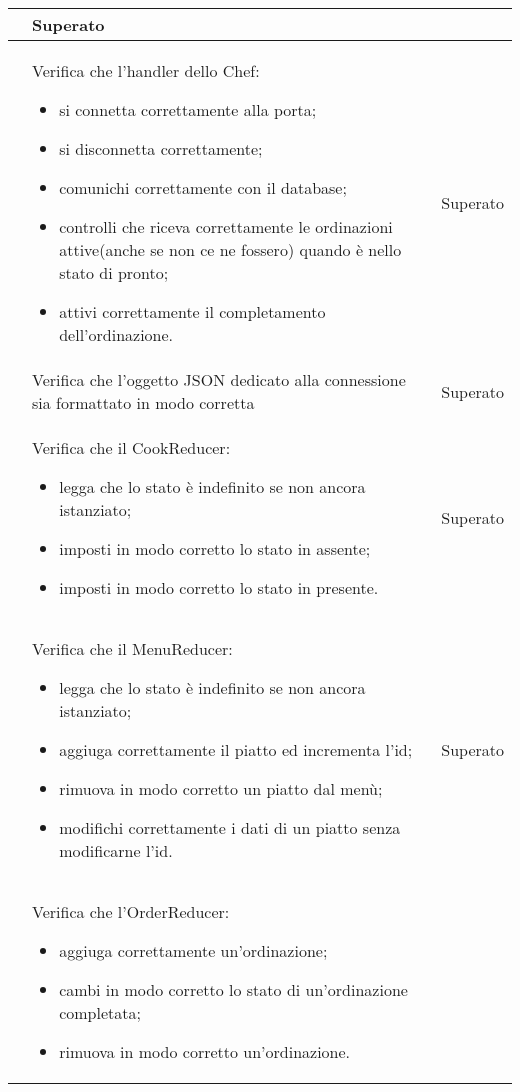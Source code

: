 \begin{longtable}{|c|P{9cm}|c|}
\begin{itemize}
	 \end{itemize}
	 & Superato \\
	 \hline{} & Verifica che l'handler dello Chef:
	 \begin{itemize}
	 	\item si connetta correttamente alla porta;
	 	\item si disconnetta correttamente;
	 	\item comunichi correttamente con il database;
	 	\item controlli che riceva correttamente le ordinazioni attive(anche se non ce ne fossero) quando è nello stato di pronto;
	 	\item attivi correttamente il completamento dell'ordinazione.
	 \end{itemize}
 	& Superato \\
	\hline{} & Verifica che l'oggetto JSON dedicato alla connessione sia formattato in modo corretta & Superato \\
	\hline {} & Verifica che il CookReducer:
	\begin{itemize}
		\item legga che lo stato è indefinito se non ancora istanziato;
		\item imposti in modo corretto lo stato in assente;
		\item imposti in modo corretto lo stato in presente.
	\end{itemize}
	& Superato \\
	\hline {} & Verifica che il MenuReducer:
	\begin{itemize}
		\item legga che lo stato è indefinito se non ancora istanziato;
		\item aggiuga correttamente il piatto ed incrementa l'id;
		\item rimuova in modo corretto un piatto dal menù;
		\item modifichi correttamente i dati di un piatto senza modificarne l'id.
	\end{itemize}
	& Superato \\
	\hline {} & Verifica che l'OrderReducer:
	\begin{itemize}
		\item aggiuga correttamente un'ordinazione;
		\item cambi in modo corretto lo stato di un'ordinazione completata;
		\item rimuova in modo corretto un'ordinazione.
	\end{itemize}

\end{longtable}
